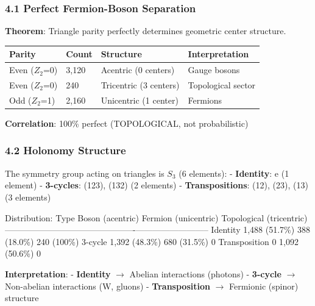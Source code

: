 \documentclass[11pt]{article}
\newcounter{none}
\begin{document}
\subsubsection{4.1 Perfect Fermion-Boson
Separation}\label{perfect-fermion-boson-separation}

\textbf{Theorem}: Triangle parity perfectly determines geometric center
structure.

{\def\LTcaptype{none} %
\begin{longtable}[]{@{}llll@{}}
\toprule\noalign{}
Parity & Count & Structure & Interpretation \\
\midrule\noalign{}
\endhead
\bottomrule\noalign{}
\endlastfoot
Even (\(Z_{2}\)=0) & 3,120 & Acentric (0 centers) & Gauge bosons \\
Even (\(Z_{2}\)=0) & 240 & Tricentric (3 centers) & Topological
sector \\
Odd (\(Z_{2}\)=1) & 2,160 & Unicentric (1 center) & Fermions \\
\end{longtable}
}

\textbf{Correlation}: 100\% perfect (TOPOLOGICAL, not probabilistic)

\subsubsection{4.2 Holonomy Structure}\label{holonomy-structure}

The symmetry group acting on triangles is \(S_{3}\) (6 elements): -
\textbf{Identity}: e (1 element) - \textbf{3-cycles}: (123), (132) (2
elements) - \textbf{Transpositions}: (12), (23), (13) (3 elements)

Distribution: \textbar{} Type \textbar{} Boson (acentric) \textbar{}
Fermion (unicentric) \textbar{} Topological (tricentric) \textbar{}
\textbar------\textbar------------------\textbar----------------------\textbar--------------------------\textbar{}
\textbar{} Identity \textbar{} 1,488 (51.7\%) \textbar{} 388 (18.0\%)
\textbar{} 240 (100\%) \textbar{} \textbar{} 3-cycle \textbar{} 1,392
(48.3\%) \textbar{} 680 (31.5\%) \textbar{} 0 \textbar{} \textbar{}
Transposition \textbar{} 0 \textbar{} 1,092 (50.6\%) \textbar{} 0
\textbar{}

\textbf{Interpretation}: - \textbf{Identity} \ensuremath{\rightarrow}
Abelian interactions (photons) - \textbf{3-cycle}
\ensuremath{\rightarrow} Non-abelian interactions (W, gluons) -
\textbf{Transposition} \ensuremath{\rightarrow} Fermionic (spinor)
structure
\end{document}
